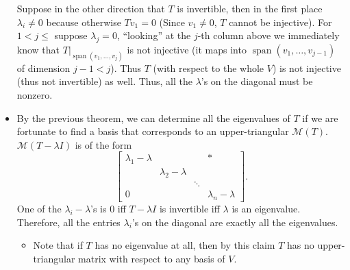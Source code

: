 \documentclass[11pt]{article}
\newcommand{\s}{\operatorname{span}}
\newcommand{\M}{\mathcal{M}}
\begin{document}
\begin{itemize}
    Suppose in the other direction that $T$ is invertible, then in the first place $\lambda_i \not= 0$ because otherwise $Tv_1 = 0$ (Since $v_1 \not= 0$, $T$ cannot be injective). For $1 < j \leq $ suppose $\lambda_j = 0$, ``looking'' at the $j$-th column above we immediately know that $T|_{\s(v_1,\dots,v_j)}$ is not injective (it maps into $\s(v_1,\dots,v_{j-1})$ of dimension $j-1<j$). Thus $T$ (with respect to the whole $V$) is not injective (thus not invertible) as well. Thus, all the $\lambda$'s on the diagonal must be nonzero.
    \item By the previous theorem, we can determine all the eigenvalues of $T$ if we are fortunate to find a basis that corresponds to an upper-triangular $\M(T)$. $\M(T - \lambda I)$ is of the form
    \begin{equation*}
        \begin{bmatrix}
        \lambda_1 - \lambda & & & \ast \\
         & \lambda_2 - \lambda & & \\
         & & \ddots & \\
         0 & & & \lambda_n - \lambda
    \end{bmatrix}.
    \end{equation*}
    One of the $\lambda_i - \lambda$'s is 0 iff $T - \lambda I$ is invertible iff $\lambda$ is an eigenvalue. Therefore, all the entries $\lambda_i$'s on the diagonal are exactly all the eigenvalues.
    \begin{itemize}
        \item Note that if $T$ has no eigenvalue at all, then by this claim $T$ has no upper-triangular matrix with respect to any basis of $V$.
    \end{itemize}
\end{itemize}
\end{document}
